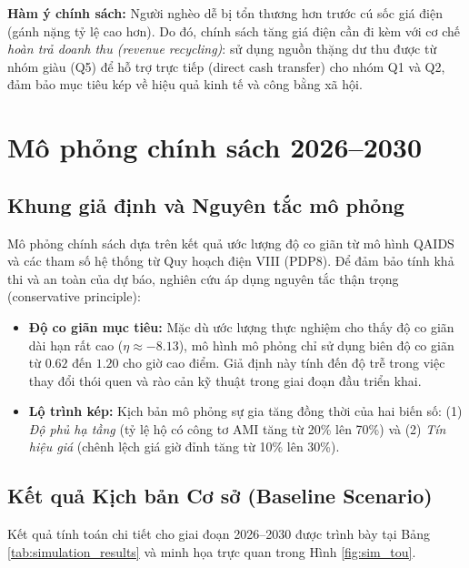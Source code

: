 \documentclass[12pt,a4paper,oneside]{article}
\begin{document}
\textbf{Hàm ý chính sách:} 
Người nghèo dễ bị tổn thương hơn trước cú sốc giá điện (gánh nặng tỷ lệ cao hơn). Do đó, chính sách tăng giá điện cần đi kèm với cơ chế \textit{hoàn trả doanh thu (revenue recycling)}: sử dụng nguồn thặng dư thu được từ nhóm giàu (Q5) để hỗ trợ trực tiếp (direct cash transfer) cho nhóm Q1 và Q2, đảm bảo mục tiêu kép về hiệu quả kinh tế và công bằng xã hội.
		
\section{Mô phỏng chính sách 2026--2030}
\subsection{Khung giả định và Nguyên tắc mô phỏng}
Mô phỏng chính sách dựa trên kết quả ước lượng độ co giãn từ mô hình QAIDS và các tham số hệ thống từ Quy hoạch điện VIII (PDP8). Để đảm bảo tính khả thi và an toàn của dự báo, nghiên cứu áp dụng nguyên tắc thận trọng (conservative principle):

\begin{itemize}
	\item \textbf{Độ co giãn mục tiêu:} Mặc dù ước lượng thực nghiệm cho thấy độ co giãn dài hạn rất cao ($\eta \approx -8.13$), mô hình mô phỏng chỉ sử dụng biên độ co giãn từ $0.62$ đến $1.20$ cho giờ cao điểm. Giả định này tính đến độ trễ trong việc thay đổi thói quen và rào cản kỹ thuật trong giai đoạn đầu triển khai.
	\item \textbf{Lộ trình kép:} Kịch bản mô phỏng sự gia tăng đồng thời của hai biến số: (1) \textit{Độ phủ hạ tầng} (tỷ lệ hộ có công tơ AMI tăng từ 20\% lên 70\%) và (2) \textit{Tín hiệu giá} (chênh lệch giá giờ đỉnh tăng từ 10\% lên 30\%).
\end{itemize}

\subsection{Kết quả Kịch bản Cơ sở (Baseline Scenario)}
Kết quả tính toán chi tiết cho giai đoạn 2026--2030 được trình bày tại Bảng \ref{tab:simulation_results} và minh họa trực quan trong Hình \ref{fig:sim_tou}.
\end{document}
